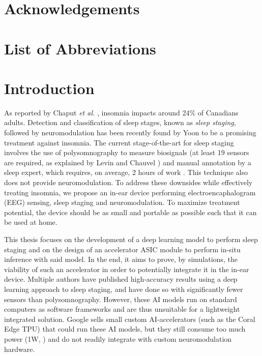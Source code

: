 \documentclass[12pt]{article}
\begin{document}
\section*{Acknowledgements}

\newpage

\tableofcontents
\newpage

\listoffigures
\newpage

\listoftables
\newpage

\section*{List of Abbreviations}

\newpage


\section{Introduction}
\label{sec:intro}
As reported by Chaput \textit{et al.} \cite{insomnia_prevalence}, insomnia impacts around 24\% of Canadians adults. Detection and classification of sleep stages, known as
\textit{sleep staging}, followed by neuromodulation has been recently found by Yoon \cite{yoon2021neuromodulation} to be a promising treatment against insomnia. The current
stage-of-the-art for sleep staging involves the use of polysomnography to measure biosignals (at least 19 sensors are required, as explained by Levin and Chauvel \cite{RUNDO2019381})
and manual annotation by a sleep expert, which requires, on average, 2 hours of work \cite{phan2022automatic}. This technique also does not provide neuromodulation. To address
these downsides while effectively treating insomnia, we propose an in-ear device performing electroencaphalogram (EEG) sensing, sleep staging and neuromodulation. To maximize
treatment potential, the device should be as small and portable as possible such that it can be used at home.

This thesis focuses on the development of a deep learning model to perform sleep staging and on the design of an accelerator ASIC module to perform in-situ inference with said
model. In the end, it aims to prove, by simulations, the viability of such an accelerator in order to potentially integrate it in the in-ear device. Multiple authors
\cite{dutt2023sleepxai, fu2021deep, eldele2021attention} have published high-accuracy results using a deep learning approach to sleep staging, and have done so with significantly
fewer sensors than polysomnography. However, these AI models run on standard computers as software frameworks and are thus unsuitable for a lightweight integrated solution.
Google sells small custom AI-accelerators (such as the Coral Edge TPU) that could run these AI models, but they still consume too much power (1W, \cite{coral_datasheet}) and do
not readily integrate with custom neuromodulation hardware.
\end{document}
